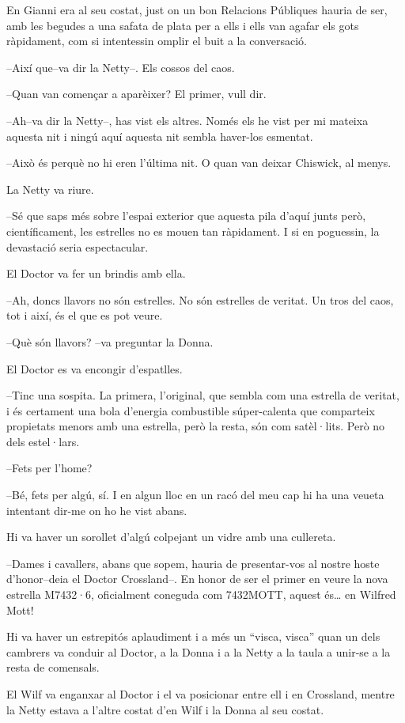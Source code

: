 En Gianni era al seu costat, just on un bon Relacions Públiques hauria
de ser, amb les begudes a una safata de plata per a ells i ells van
agafar els gots ràpidament, com si intentessin omplir el buit a la
conversació.

--Així que--va dir la Netty--. Els cossos del caos.

--Quan van començar a aparèixer? El primer, vull dir.

--Ah--va dir la Netty--, has vist els altres. Només els he vist per mi
mateixa aquesta nit i ningú aquí aquesta nit sembla haver-los esmentat.

--Això és perquè no hi eren l'última nit. O quan van deixar Chiswick, al
menys.

La Netty va riure.

--Sé que saps més sobre l'espai exterior que aquesta pila d'aquí junts
però, científicament, les estrelles no es mouen tan ràpidament. I si en
poguessin, la devastació seria espectacular.

El Doctor va fer un brindis amb ella.

--Ah, doncs llavors no són estrelles. No són estrelles de veritat. Un
tros del caos, tot i així, és el que es pot veure.

--Què són llavors? --va preguntar la Donna.

El Doctor es va encongir d'espatlles.

--Tinc una sospita. La primera, l'original, que sembla com una estrella
de veritat, i és certament una bola d'energia combustible súper-calenta
que comparteix propietats menors amb una estrella, però la resta, són
com satèl·lits. Però no dels estel·lars.

--Fets per l'home?

--Bé, fets per algú, sí. I en algun lloc en un racó del meu cap hi ha
una veueta intentant dir-me on ho he vist abans.

Hi va haver un sorollet d'algú colpejant un vidre amb una cullereta.

--Dames i cavallers, abans que sopem, hauria de presentar-vos al nostre
hoste d'honor--deia el Doctor Crossland--. En honor de ser el primer en
veure la nova estrella M7432·6, oficialment coneguda com 7432MOTT,
aquest és\ldots{} en Wilfred Mott!

Hi va haver un estrepitós aplaudiment i a més un ``visca, visca'' quan
un dels cambrers va conduir al Doctor, a la Donna i a la Netty a la
taula a unir-se a la resta de comensals.

El Wilf va enganxar al Doctor i el va posicionar entre ell i en
Crossland, mentre la Netty estava a l'altre costat d'en Wilf i la Donna
al seu costat.

